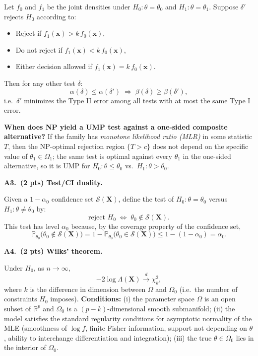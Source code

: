 \documentclass[11pt]{article}
\begin{document}
Let $f_0$ and $f_1$ be the joint densities under $H_0\!: \theta = \theta_0$ and $H_1\!: \theta = \theta_1$. Suppose $\delta'$ rejects $H_0$ according to:
\begin{itemize}[leftmargin=2em, itemsep=0pt]
    \item Reject if $f_1(\mathbf{x}) > k\, f_0(\mathbf{x})$,
    \item Do not reject if $f_1(\mathbf{x}) < k\, f_0(\mathbf{x})$,
    \item Either decision allowed if $f_1(\mathbf{x}) = k\, f_0(\mathbf{x})$.
\end{itemize}
Then for any other test $\delta$:
\[
    \alpha(\delta) \le \alpha(\delta') \;\Longrightarrow\; \beta(\delta) \ge \beta(\delta'),
\]
i.e.\ $\delta'$ minimizes the Type II error among all tests with at most the same Type I error.

\textbf{When does NP yield a UMP test against a one-sided composite alternative?} If the family has \emph{monotone likelihood ratio (MLR)} in some statistic $T$, then the NP-optimal rejection region $\{T > c\}$ does not depend on the specific value of $\theta_1 \in \Omega_1$; the same test is optimal against every $\theta_1$ in the one-sided alternative, so it is UMP for $H_0\!: \theta \le \theta_0$ vs.\ $H_1\!: \theta > \theta_0$.

\vspace{0.4em}

\textbf{A3.\ (2 pts) Test/CI duality.}

Given a $1-\alpha_0$ confidence set $\mathcal{S}(\mathbf{X})$, define the test of $H_0\!: \theta = \theta_0$ versus $H_1\!: \theta \neq \theta_0$ by:
\[
    \text{reject } H_0 \;\iff\; \theta_0 \notin \mathcal{S}(\mathbf{X}).
\]
This test has level $\alpha_0$ because, by the coverage property of the confidence set,
\[
    \mathbb{P}_{\theta_0}\bigl(\theta_0 \notin \mathcal{S}(\mathbf{X})\bigr) = 1 - \mathbb{P}_{\theta_0}\bigl(\theta_0 \in \mathcal{S}(\mathbf{X})\bigr) \le 1 - (1 - \alpha_0) = \alpha_0.
\]

\vspace{0.4em}

\textbf{A4.\ (2 pts) Wilks' theorem.}

Under $H_0$, as $n \to \infty$,
\[
    -2 \log \Lambda(\mathbf{X}) \xrightarrow{d} \chi^2_k,
\]
where $k$ is the difference in dimension between $\Omega$ and $\Omega_0$ (i.e.\ the number of constraints $H_0$ imposes). \textbf{Conditions:} (i) the parameter space $\Omega$ is an open subset of $\mathbb{R}^p$ and $\Omega_0$ is a $(p-k)$-dimensional smooth submanifold; (ii) the model satisfies the standard regularity conditions for asymptotic normality of the MLE (smoothness of $\log f$, finite Fisher information, support not depending on $\theta$, ability to interchange differentiation and integration); (iii) the true $\theta \in \Omega_0$ lies in the interior of $\Omega_0$.
\end{document}
